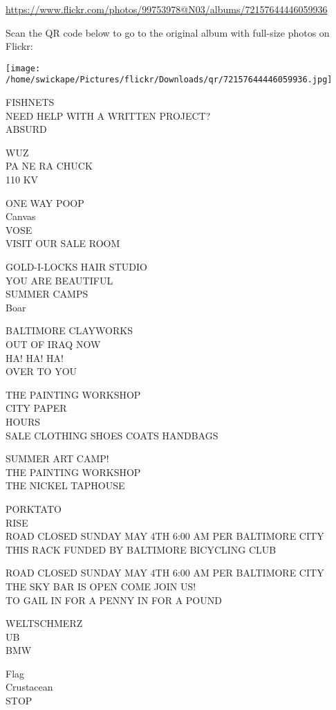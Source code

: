 \documentclass[10pt,letterpaper]{article}
\begin{document}
\url{https://www.flickr.com/photos/99753978@N03/albums/72157644446059936}

Scan the QR code below to go to the original album with full-size photos on Flickr:

\texttt{[image: /home/swickape/Pictures/flickr/Downloads/qr/72157644446059936.jpg]}


FISHNETS\\
NEED HELP WITH A WRITTEN PROJECT?\\
ABSURD

WUZ\\
PA NE RA CHUCK\\
110 KV

ONE WAY POOP\\
Canvas\\
VOSE\\
VISIT OUR SALE ROOM

GOLD{-}I{-}LOCKS HAIR STUDIO\\
YOU ARE BEAUTIFUL\\
SUMMER CAMPS\\
Boar

BALTIMORE CLAYWORKS\\
OUT OF IRAQ NOW\\
HA! HA! HA!\\
OVER TO YOU

THE PAINTING WORKSHOP\\
CITY PAPER\\
HOURS\\
SALE CLOTHING SHOES COATS HANDBAGS

SUMMER ART CAMP!\\
THE PAINTING WORKSHOP\\
THE NICKEL TAPHOUSE

PORKTATO\\
RISE\\
ROAD CLOSED SUNDAY MAY 4TH 6:00 AM PER BALTIMORE CITY\\
THIS RACK FUNDED BY BALTIMORE BICYCLING CLUB

ROAD CLOSED SUNDAY MAY 4TH 6:00 AM PER BALTIMORE CITY\\
THE SKY BAR IS OPEN COME JOIN US!\\
TO GAIL IN FOR A PENNY IN FOR A POUND

WELTSCHMERZ\\
UB\\
BMW

Flag\\
Crustacean\\
STOP
\end{document}
